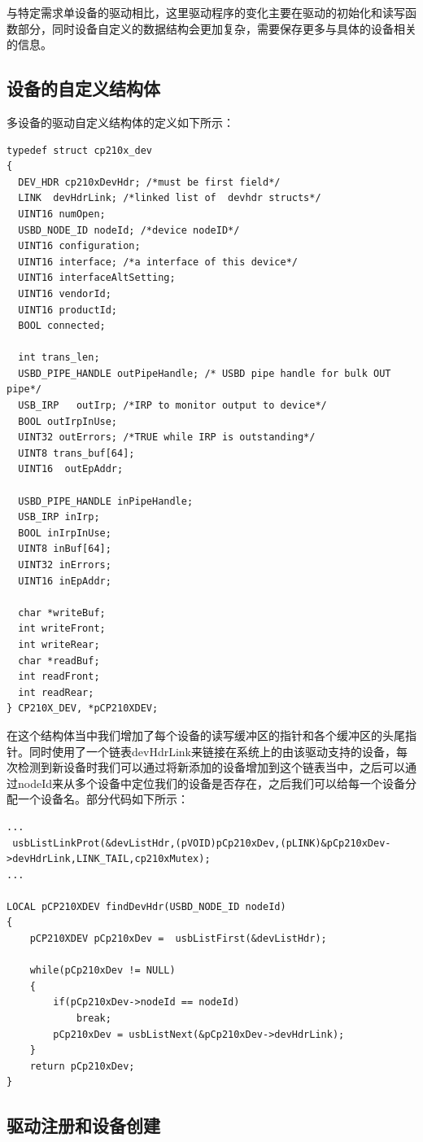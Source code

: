与特定需求单设备的驱动相比，这里驱动程序的变化主要在驱动的初始化和读写函数部分，同时设备自定义的数据结构会更加复杂，需要保存更多与具体的设备相关的信息。

\subsection{设备的自定义结构体}
多设备的驱动自定义结构体的定义如下所示：
\lstset{language=C}
\begin{lstlisting}
typedef struct cp210x_dev
{
  DEV_HDR cp210xDevHdr; /*must be first field*/
  LINK 	devHdrLink; /*linked list of  devhdr structs*/
  UINT16 numOpen;
  USBD_NODE_ID nodeId; /*device nodeID*/
  UINT16 configuration; 
  UINT16 interface; /*a interface of this device*/
  UINT16 interfaceAltSetting;
  UINT16 vendorId;
  UINT16 productId;
  BOOL connected;
  
  int trans_len;
  USBD_PIPE_HANDLE outPipeHandle; /* USBD pipe handle for bulk OUT pipe*/
  USB_IRP	outIrp; /*IRP to monitor output to device*/
  BOOL outIrpInUse;
  UINT32 outErrors; /*TRUE while IRP is outstanding*/
  UINT8 trans_buf[64];
  UINT16  outEpAddr;  
  
  USBD_PIPE_HANDLE inPipeHandle;
  USB_IRP inIrp;
  BOOL inIrpInUse;
  UINT8 inBuf[64];
  UINT32 inErrors;
  UINT16 inEpAddr;
  
  char *writeBuf;
  int writeFront;
  int writeRear;
  char *readBuf;
  int readFront;
  int readRear;
} CP210X_DEV, *pCP210XDEV;
\end{lstlisting}
	在这个结构体当中我们增加了每个设备的读写缓冲区的指针和各个缓冲区的头尾指针。同时使用了一个链表devHdrLink来链接在系统上的由该驱动支持的设备，每次检测到新设备时我们可以通过将新添加的设备增加到这个链表当中，之后可以通过nodeId来从多个设备中定位我们的设备是否存在，之后我们可以给每一个设备分配一个设备名。部分代码如下所示：
\lstset{language=C}
\begin{lstlisting}
...
 usbListLinkProt(&devListHdr,(pVOID)pCp210xDev,(pLINK)&pCp210xDev->devHdrLink,LINK_TAIL,cp210xMutex);
...

LOCAL pCP210XDEV findDevHdr(USBD_NODE_ID nodeId)
{
	pCP210XDEV pCp210xDev =  usbListFirst(&devListHdr);

	while(pCp210xDev != NULL)
	{
		if(pCp210xDev->nodeId == nodeId)
			break;
		pCp210xDev = usbListNext(&pCp210xDev->devHdrLink);
	}
	return pCp210xDev;
}
\end{lstlisting}

\subsection{驱动注册和设备创建}

